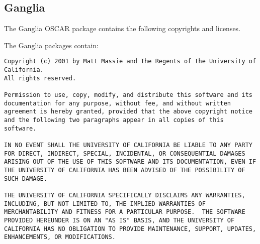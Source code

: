 %
%
%

\subsection{Ganglia}
The Ganglia OSCAR package contains the following copyrights and licenses.

The Ganglia packages contain:

\begin{verbatim}
Copyright (c) 2001 by Matt Massie and The Regents of the University of
California.
All rights reserved.

Permission to use, copy, modify, and distribute this software and its
documentation for any purpose, without fee, and without written
agreement is hereby granted, provided that the above copyright notice
and the following two paragraphs appear in all copies of this
software.

IN NO EVENT SHALL THE UNIVERSITY OF CALIFORNIA BE LIABLE TO ANY PARTY
FOR DIRECT, INDIRECT, SPECIAL, INCIDENTAL, OR CONSEQUENTIAL DAMAGES
ARISING OUT OF THE USE OF THIS SOFTWARE AND ITS DOCUMENTATION, EVEN IF
THE UNIVERSITY OF CALIFORNIA HAS BEEN ADVISED OF THE POSSIBILITY OF
SUCH DAMAGE.

THE UNIVERSITY OF CALIFORNIA SPECIFICALLY DISCLAIMS ANY WARRANTIES,
INCLUDING, BUT NOT LIMITED TO, THE IMPLIED WARRANTIES OF
MERCHANTABILITY AND FITNESS FOR A PARTICULAR PURPOSE.  THE SOFTWARE
PROVIDED HEREUNDER IS ON AN "AS IS" BASIS, AND THE UNIVERSITY OF
CALIFORNIA HAS NO OBLIGATION TO PROVIDE MAINTENANCE, SUPPORT, UPDATES,
ENHANCEMENTS, OR MODIFICATIONS.
\end{verbatim}

